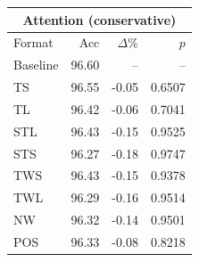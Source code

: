 \begin{tabular}{lrrr}
\toprule
\multicolumn{4}{c}{\textbf{Attention (conservative)}} \\
\midrule
Format & Acc & $\Delta$\% & $p$ \\
\midrule
Baseline & 96.60 & -- & -- \\
\midrule
TS & 96.55 & -0.05 & 0.6507 \\
TL & 96.42 & -0.06 & 0.7041 \\
STL & 96.43 & -0.15 & 0.9525 \\
STS & 96.27 & -0.18 & 0.9747 \\
TWS & 96.43 & -0.15 & 0.9378 \\
TWL & 96.29 & -0.16 & 0.9514 \\
NW & 96.32 & -0.14 & 0.9501 \\
POS & 96.33 & -0.08 & 0.8218 \\
\bottomrule
\end{tabular}